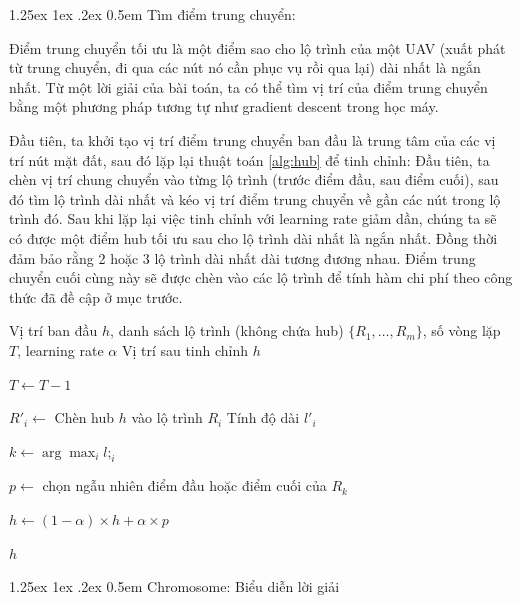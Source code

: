 \documentclass[a4paper]{article}
\makeatletter
\renewcommand{\paragraph}{%
  \@startsection{paragraph}{4}{\z@}%
  {1.25ex \@plus 1ex \@minus .2ex}%
  {0.5em}%
  {\normalfont\normalsize\bfseries}%
}
\makeatother
\begin{document}
\paragraph{Tìm điểm trung chuyển:}

Điểm trung chuyển tối ưu là một điểm sao cho lộ trình của một UAV (xuất phát từ trung chuyển, đi qua các nút nó cần phục vụ rồi qua lại) dài nhất là ngắn nhất. Từ một lời giải của bài toán, ta có thể tìm vị trí của điểm trung chuyển bằng một phương pháp tương tự như gradient descent trong học máy.

Đầu tiên, ta khởi tạo vị trí điểm trung chuyển ban đầu là trung tâm của các vị trí nút mặt đất, sau đó lặp lại thuật toán \ref{alg:hub} để tinh chỉnh: Đầu tiên, ta chèn vị trí chung chuyển vào từng lộ trình (trước điểm đầu, sau điểm cuối), sau đó tìm lộ trình dài nhất và kéo vị trí điểm trung chuyển về gần các nút trong lộ trình đó. Sau khi lặp lại việc tinh chỉnh với learning rate giảm dần, chúng ta sẽ có được một điểm hub tối ưu sau cho lộ trình dài nhất là ngắn nhất. Đồng thời đảm bảo rằng 2 hoặc 3 lộ trình dài nhất dài tương đương nhau. Điểm trung chuyển cuối cùng này sẽ được chèn vào các lộ trình để tính hàm chi phí theo công thức đã đề cập ở mục trước.

\begin{algorithm}
\caption{Tinh chỉnh vị trí hub}
\label{alg:hub}
\begin{algorithmic}[1]

\Require Vị trí ban đầu $h$, danh sách lộ trình (không chứa hub) $\{R_1,\dots,R_m\}$, số vòng lặp $T$, learning rate $\alpha$
\Ensure Vị trí sau tinh chỉnh $h$

    \State $T \gets T - 1$

        \State $R'_i \gets$ Chèn hub $h$ vào lộ trình $R_i$
        \State Tính độ dài $l'_i$
    \EndFor

    \State $k \gets \arg\max_i l;_i$

    \State $p \gets$ chọn ngẫu nhiên điểm đầu hoặc điểm cuối của $R_k$

    \State $h \gets (1-\alpha) \times h + \alpha \times p$
\EndWhile

\State \Return $h$

\end{algorithmic}
\end{algorithm}

\paragraph{Chromosome: Biểu diễn lời giải}
\end{document}
